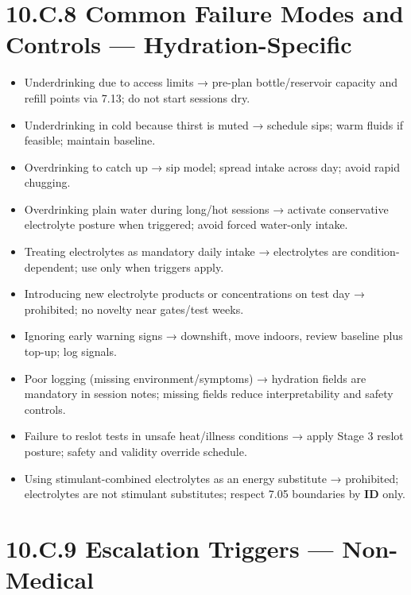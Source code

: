 \documentclass[10pt]{article}
\begin{document}
\endgroup

\newpage

\section*{10.C.8 Common Failure Modes and Controls — Hydration-Specific}
{}

\begin{itemize}
\item Underdrinking due to access limits → pre-plan bottle/reservoir capacity and refill points via 7.13; do not start sessions dry.
\item Underdrinking in cold because thirst is muted → schedule sips; warm fluids if feasible; maintain baseline.
\item Overdrinking to catch up → sip model; spread intake across day; avoid rapid chugging.
\item Overdrinking plain water during long/hot sessions → activate conservative electrolyte posture when triggered; avoid forced water-only intake.
\item Treating electrolytes as mandatory daily intake → electrolytes are condition-dependent; use only when triggers apply.
\item Introducing new electrolyte products or concentrations on test day → prohibited; no novelty near gates/test weeks.
\item Ignoring early warning signs → downshift, move indoors, review baseline plus top-up; log signals.
\item Poor logging (missing environment/symptoms) → hydration fields are mandatory in session notes; missing fields reduce interpretability and safety controls.
\item Failure to reslot tests in unsafe heat/illness conditions → apply Stage 3 reslot posture; safety and validity override schedule.
\item Using stimulant-combined electrolytes as an energy substitute → prohibited; electrolytes are not stimulant substitutes; respect 7.05 boundaries by \textbf{ID} only.
\end{itemize}

\newpage

\section*{10.C.9 Escalation Triggers — Non-Medical}
{}
\end{document}
